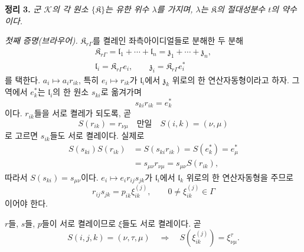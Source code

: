 \textbf{정리 3.} \emph{군 \(\mathscr K\)의 각 원소 \(\{\mathfrak K\}\)는 유한 위수 \(\lambda\)를 가지며, \(\lambda\)는 \(\mathfrak K\)의 절대성분수 \(t\)의 약수이다.}

\emph{첫째 증명(브라우어).} \(\mathfrak K_{r\Gamma}\)를 켤레인 좌측아이디얼들로 분해한 두 분해
\[
\begin{gathered}
\mathfrak K_{r\Gamma}
=\mathfrak l_1+\cdots+\mathfrak l_n
=\mathfrak z_1+\cdots+\mathfrak z_n,\\
\mathfrak l_i=\mathfrak K_{r\Gamma}e_i,
\qquad
\mathfrak z_i=\mathfrak K_{r\Gamma}e_i^*
\end{gathered}
\]
를 택한다. \(a_i\mapsto a_ir_{ik}\), 특히 \(e_i\mapsto r_{ik}\)가 \(\mathfrak l_i\)에서 \(\mathfrak z_k\) 위로의 한 연산자동형이라고 하자. 그 역에서 \(e_k^*\)는 \(\mathfrak l_i\)의 한 원소 \(s_{ki}\)로 옮겨가며
\[
        s_{ki}r_{ik}=e_k^*
\]
이다. \(r_{ik}\)들을 서로 켤레가 되도록, 곧
\[
        S(r_{ik})=r_{\nu\mu}
        \quad\text{만일}\quad
        S(i,k)=(\nu,\mu)
\]
로 고르면 \(s_{ik}\)들도 서로 켤레이다. 실제로
\[
\begin{aligned}
S(s_{ki})S(r_{ik})
 &=S(s_{ki}r_{ik})
  =S(e_k^*)
  =e_\mu^*\\
 &=s_{\mu\nu}r_{\nu\mu}
  =s_{\mu\nu}S(r_{ik}),
\end{aligned}
\]
따라서 \(S(s_{ki})=s_{\mu\nu}\)이다. \(e_i\mapsto e_ir_{ij}s_{jk}\)가 \(\mathfrak l_i\)에서 \(\mathfrak l_k\) 위로의 한 연산자동형을 주므로
\[
        r_{ij}s_{jk}
        =p_{ik}\xi_{ik}^{(j)},
        \qquad
        0\ne\xi_{ik}^{(j)}\in\Gamma
\]
이어야 한다.

\(r\)들, \(s\)들, \(p\)들이 서로 켤레이므로 \(\xi\)들도 서로 켤레이다. 곧
\[
        S(i,j,k)=(\nu,\tau,\mu)
        \quad\Longrightarrow\quad
        S(\xi_{ik}^{(j)})=\xi_{\nu\mu}^{\tau}.
\]

